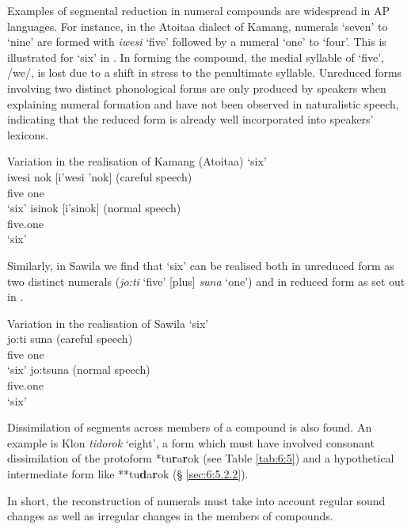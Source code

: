 Examples of segmental reduction in numeral compounds are widespread in AP languages. For instance, in the Atoitaa dialect of Kamang, numerals `seven' to `nine' are formed with \textit{iwesi}\textit{{\ng}} `five' followed by a numeral `one' to `four'. This is illustrated for `six' in . In forming the compound, the medial syllable of `five', /we/, is lost due to a shift in stress to the penultimate syllable. Unreduced forms involving two distinct phonological forms are only produced by speakers when explaining numeral formation and have not been observed in naturalistic speech, indicating that the reduced form is already well incorporated into speakers' lexicons.



\ea%
\label{ex:6:1}
  Variation in the realisation of Kamang (Atoitaa) `six'\\
\ea
\gll iwesi{\ng} nok [i'wesi{\ng} 'nok]    (careful speech)\\
      five    one    \\
\glt `six'
\ex
\gll isi{\ng}nok        [i'si{\ng}nok]    (normal speech)\\
     five.one  \\
\glt`six'
\z
\z

 
    

Similarly, in Sawila we find that `six' can be realised both in unreduced form as two distinct numerals (\textit{jo:ti}\textit{{\ng}} `five' [plus] \textit{suna} `one') and in reduced form as set out in .  



\ea%
\label{ex:6:2}
Variation in the realisation of Sawila `six'\\
\ea
\gll jo:ti{\ng} suna          (careful speech)\\
    five    one     \\
\glt`six'
\ex
\gll jo:tsuna            (normal speech)\\
      five.one  \\
\glt   `six'
\z
\z


 

Dissimilation of segments across members of a compound is also found. An example is Klon \textit{tidorok} `eight', a form which must have involved consonant dissimilation of the protoform *tu\textbf{r}a\textbf{r}ok (see Table \ref{tab:6:5}) and a hypothetical intermediate form like **tu\textbf{d}a\textbf{r}ok ({\S} \ref{sec:6:5.2.2}).

In short, the reconstruction of numerals must take into account regular sound changes as well as irregular changes in the members of compounds. 

